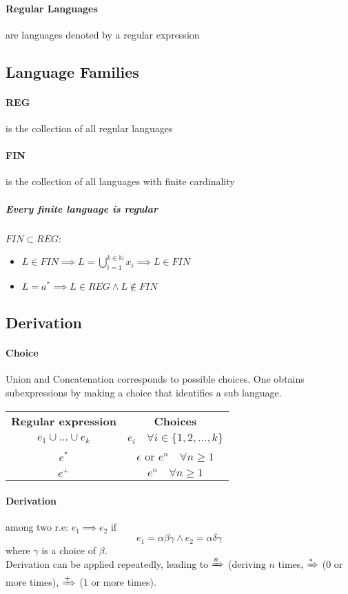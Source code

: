 \documentclass{article}
\newcommand{\N}{\mathds{N}}
\begin{document}
\paragraph{Regular Languages} are languages denoted by a regular expression
\subsection{Language Families}
\paragraph{REG} is the collection of all regular languages
\paragraph{FIN} is the collection of all languages with finite cardinality
\subparagraph{Every finite language is regular} $FIN \subset REG$: 
\begin{itemize}
\item $L\in FIN \implies L = \bigcup_{i=1}^{k \in \N} x_i \implies L \in FIN$
\item $L=a^* \implies L \in REG \wedge L \notin FIN$
\end{itemize}



\subsection{Derivation}
\paragraph{Choice} Union and Concatenation corresponds to possible choices. One obtains subexpressions by making a choice that identifies a sub language.
\begin{table}[h!]
\begin{center}
\begin{tabular}{cc}
\textbf{Regular expression}	&	\textbf{Choices}\\
$e_1\cup ... \cup e_k$	&	$e_i \quad \forall i \in \{1,2,...,k\}$\\
$e^*$	&	$\epsilon$ or $e^n \quad \forall n\geq 1$\\
$e^+$	&	$e^n \quad \forall n\geq 1$\\ 
\end{tabular}
\end{center}
\end{table}
\paragraph{Derivation} among two r.e: $e_1 \implies e_2$ if 
\[e_1=\alpha \beta \gamma \wedge e_2=\alpha \delta \gamma\]
where $\gamma$ is a choice of $\beta$.\\
Derivation can be applied repeatedly, leading to $\xRightarrow{n}$ (deriving $n$ times, $\xRightarrow{*}$ (0 or more times), $\xRightarrow{+}$ (1 or more times). 
\end{document}
